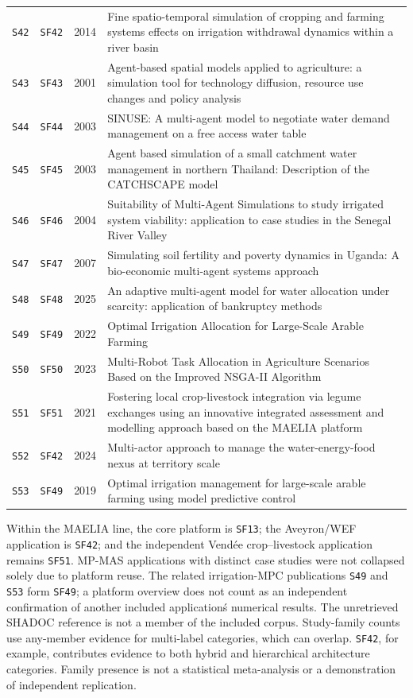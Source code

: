 \begin{longtable}{@{}p{}p{}p{}p{}@{}}
\texttt{S42} & \texttt{SF42} & 2014 & Fine spatio-temporal simulation of cropping and farming systems effects on irrigation withdrawal dynamics within a river basin\\
\texttt{S43} & \texttt{SF43} & 2001 & Agent-based spatial models applied to agriculture: a simulation tool for technology diffusion, resource use changes and policy analysis\\
\texttt{S44} & \texttt{SF44} & 2003 & SINUSE: A multi-agent model to negotiate water demand management on a free access water table\\
\texttt{S45} & \texttt{SF45} & 2003 & Agent based simulation of a small catchment water management in northern Thailand: Description of the CATCHSCAPE model\\
\texttt{S46} & \texttt{SF46} & 2004 & Suitability of Multi-Agent Simulations to study irrigated system viability: application to case studies in the Senegal River Valley\\
\texttt{S47} & \texttt{SF47} & 2007 & Simulating soil fertility and poverty dynamics in Uganda: A bio-economic multi-agent systems approach\\
\texttt{S48} & \texttt{SF48} & 2025 & An adaptive multi-agent model for water allocation under scarcity: application of bankruptcy methods\\
\texttt{S49} & \texttt{SF49} & 2022 & Optimal Irrigation Allocation for Large-Scale Arable Farming\\
\texttt{S50} & \texttt{SF50} & 2023 & Multi-Robot Task Allocation in Agriculture Scenarios Based on the Improved NSGA-II Algorithm\\
\texttt{S51} & \texttt{SF51} & 2021 & Fostering local crop-livestock integration via legume exchanges using an innovative integrated assessment and modelling approach based on the MAELIA platform\\
\texttt{S52} & \texttt{SF42} & 2024 & Multi-actor approach to manage the water-energy-food nexus at territory scale\\
\texttt{S53} & \texttt{SF49} & 2019 & Optimal irrigation management for large-scale arable farming using model predictive control\\
\bottomrule\end{longtable}\endgroup
Within the MAELIA line, the core platform is \texttt{SF13}; the Aveyron/WEF application is \texttt{SF42}; and the independent Vend\'ee crop--livestock application remains \texttt{SF51}. MP-MAS applications with distinct case studies were not collapsed solely due to platform reuse. The related irrigation-MPC publications \texttt{S49} and \texttt{S53} form \texttt{SF49}; a platform overview does not count as an independent confirmation of another included application\'s numerical results. The unretrieved SHADOC reference is not a member of the included corpus.
Study-family counts use any-member evidence for multi-label categories, which can overlap. \texttt{SF42}, for example, contributes evidence to both hybrid and hierarchical architecture categories. Family presence is not a statistical meta-analysis or a demonstration of independent replication.
\clearpage

